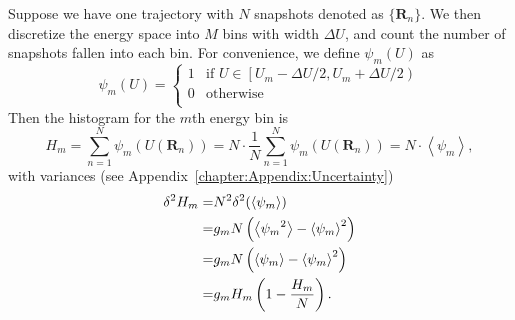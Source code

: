 Suppose we have one trajectory with $N$ snapshots denoted as $\{\mathbf{R}_n\}$. We then discretize the energy space into $M$ bins with width $\Delta U$, and count the number of snapshots fallen into each bin. For convenience, we define $\psi_m(U)$ as
\begin{equation}
	\psi_m(U)= 
	\left\{ 
	\begin{array}{rl} 
	1 & \text{if }U\in \left[ U_m-\Delta U/2, U_m+\Delta U/2\right)\\ 
	0 & \text{otherwise}\\  
	\end{array} 
	\right. 
\end{equation}
Then the histogram for the $m$th energy bin is
\begin{equation}
	H_{m}=\sum\limits_{n=1}^{N}\psi_{m}(U(\mathbf{R}_n))=N\cdot \frac 1 N\sum\limits_{n=1}^{N}\psi_{m}(U(\mathbf{R}_n))=N\cdot\left<\psi_m\right>,
\end{equation}
with variances (see Appendix~\ref{chapter:Appendix:Uncertainty})
\begin{align}
	\delta^2 H_m=&N^2\delta^2(\left<\psi_m\right>)\notag\\
	            =&g_m N\left(\left<{\psi_m}^2\right>-\left<\psi_m\right>^2\right)\notag\\
	            =&g_m N\left(\left<\psi_m\right>-\left<\psi_m\right>^2\right)\notag\\
	            =&g_m H_m\left(1-\frac{H_m}{N}\right).
\end{align}

